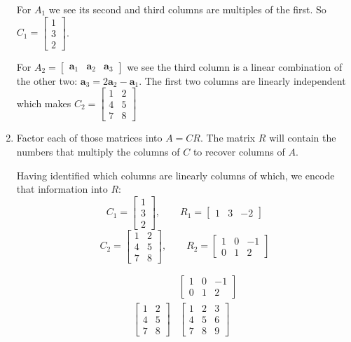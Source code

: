 \documentclass{scrartcl}
\begin{document}
\begin{enumerate}
For $A_1$ we see its second and third columns are multiples of the first. So $C_1 = \begin{bmatrix}
	1 \\ 3 \\ 2
\end{bmatrix} $.

For $A_2 = \begin{bmatrix}
	\mathbf{a}_1 & \mathbf{a}_2 & \mathbf{a}_3
\end{bmatrix}$ we see the third column is a linear combination of the other two: $\mathbf{a}_3 = 2\mathbf{a}_2 - \mathbf{a}_1$. The first two columns are linearly independent which makes $C_2 = \begin{bmatrix}
	1 & 2 \\ 4 & 5 \\ 7 & 8
\end{bmatrix}$

\item Factor each of those matrices into $A = CR$. The matrix $R$ will contain the numbers that multiply the columns of $C$ to recover columns of $A$. 

Having identified which columns are linearly columns of which, we encode that information into $R$:
$$C_1 = \begin{bmatrix}
	1 \\ 3 \\ 2
\end{bmatrix}, \qquad R_1 = \begin{bmatrix}
		1 & 3 & -2
\end{bmatrix}$$
$$ C_2 = \begin{bmatrix}
	1 & 2 \\ 4 & 5 \\ 7 & 8
\end{bmatrix}, \qquad R_2 = \begin{bmatrix}
	1 & 0 & -1 \\ 0 & 1 & 2
\end{bmatrix}$$

\begin{align*}
	&\begin{bmatrix}
		1 & 0 & -1 \\ 0 & 1 & 2
	\end{bmatrix}\\
	\begin{bmatrix}
		1 & 2 \\ 4 & 5 \\ 7 & 8
	\end{bmatrix}& \begin{bmatrix}
		1 & 2 & 3 \\
		4 & 5 & 6\\
		7 & 8 & 9
	\end{bmatrix}
\end{align*}


\end{enumerate}
\end{document}
